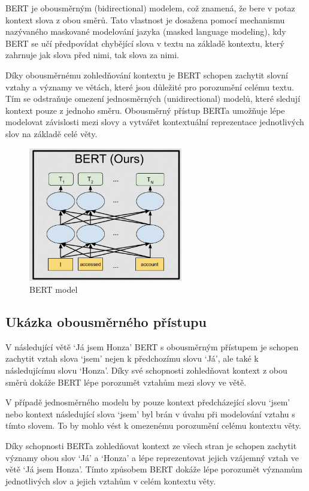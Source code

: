 BERT je obousměrným (bidirectional) modelem, což znamená, že bere v potaz kontext slova z obou směrů.
Tato vlastnost je dosažena pomocí mechanismu nazývaného maskované modelování jazyka (masked language modeling), kdy BERT se učí předpovídat chybějící slova v textu na základě kontextu, který zahrnuje jak slova před nimi, tak slova za nimi.

Díky obousměrnému zohledňování kontextu je BERT schopen zachytit slovní vztahy a významy ve větách, které jsou důležité pro porozumění celému textu.
Tím se odstraňuje omezení jednosměrných (unidirectional) modelů, které sledují kontext pouze z jednoho směru.
Obousměrný přístup BERTa umožňuje lépe modelovat závislosti mezi slovy a vytvářet kontextuální reprezentace jednotlivých slov na základě celé věty.

\begin{figure}[H]
	\centering
	\includegraphics[width=0.6\textwidth]{Figures/BERT.png}
	\caption{BERT model~\cite{link24}}\label{fig:BERT model}
\end{figure}

\subsection{Ukázka obousměrného přístupu}
V následující větě `Já jsem Honza' BERT s obousměrným přístupem je schopen zachytit vztah slova `jsem' nejen k předchozímu slovu `Já', ale také k následujícímu slovu `Honza'.
Díky své schopnosti zohledňovat kontext z obou směrů dokáže BERT lépe porozumět vztahům mezi slovy ve větě.

V případě jednosměrného modelu by pouze kontext předcházející slovu `jsem' nebo kontext následující slova `jsem' byl brán v úvahu při modelování vztahu s tímto slovem.
To by mohlo vést k omezenému porozumění celému kontextu věty.

Díky schopnosti BERTa zohledňovat kontext ze všech stran je schopen zachytit významy obou slov `Já' a `Honza' a lépe reprezentovat jejich vzájemný vztah ve větě `Já jsem Honza'.
Tímto způsobem BERT dokáže lépe porozumět významům jednotlivých slov a jejich vztahům v celém kontextu věty.

